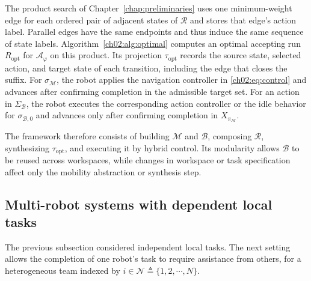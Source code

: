 \begin{revision}
The product search of Chapter~\ref{chap:preliminaries} uses one
minimum-weight edge for each ordered pair of adjacent states of $\mathcal{R}$
and stores that edge's action label. Parallel edges have the same endpoints
and thus induce the same sequence of state labels. Algorithm~\ref{ch02:alg:optimal}
computes an optimal accepting run $R_{\text{opt}}$ for $\mathcal{A}_{\varphi}$
on this product.
Its projection $\tau_{\text{opt}}$ records the source state, selected action,
and target state of each transition, including the edge that closes the suffix.
For $\sigma_{\mathcal{M}}$, the robot applies the navigation controller in
\eqref{ch02:eq:control} and advances after confirming completion in the
admissible target set. For an action in $\Sigma_{\mathcal{B}}$, the robot executes
the corresponding action controller or the idle behavior for
$\sigma_{\mathcal{B},0}$ and advances only after confirming completion in
$X_{\pi_{\mathcal{M}}}$.
\end{revision}
The framework therefore consists of building
$\mathcal{M}$ and $\mathcal{B}$, composing $\mathcal{R}$, synthesizing
$\tau_{\text{opt}}$, and executing it by hybrid control. Its modularity allows
$\mathcal{B}$ to be reused across workspaces, while changes in workspace or task
specification affect only the mobility abstraction or synthesis step.























\subsection{Multi-robot systems with dependent local tasks}
\label{ch03:sec:collaborative}

The previous subsection considered independent local tasks. The next setting
allows the completion of one robot's task to require assistance from others, for
a heterogeneous team indexed by
$i \in \mathcal{N} \triangleq \{1,2,\cdots,N\}$.

